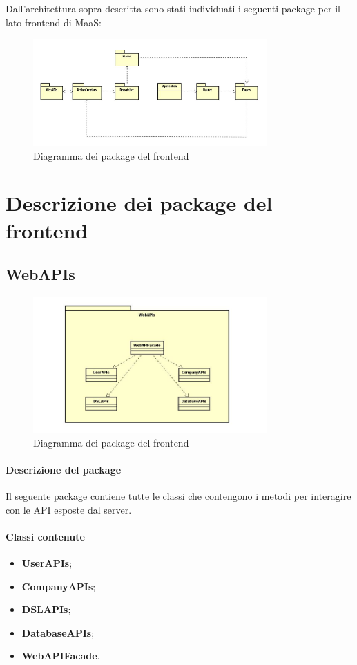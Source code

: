 Dall'architettura sopra descritta sono stati individuati i seguenti package per il lato frontend di MaaS:

\begin{figure}[h]
\centering
\includegraphics[width=0.8\textwidth]{res/sections/imgs/packages-diagram.jpg}
\caption{Diagramma dei package del frontend}
\end{figure}

\section{Descrizione dei package del frontend}
\subsection{WebAPIs}

\begin{figure}[h]
\centering
\includegraphics[width=0.8\textwidth]{res/sections/imgs/webapi-diagram.jpg}
\caption{Diagramma dei package del frontend}
\end{figure}

\paragraph*{Descrizione del package}
Il seguente package contiene tutte le classi che contengono i metodi per interagire con le API esposte dal server. 
\paragraph*{Classi contenute}
\begin{itemize}
\item \textbf{UserAPIs};
\item \textbf{CompanyAPIs};
\item \textbf{DSLAPIs};
\item \textbf{DatabaseAPIs};
\item \textbf{WebAPIFacade}.
\end{itemize}

